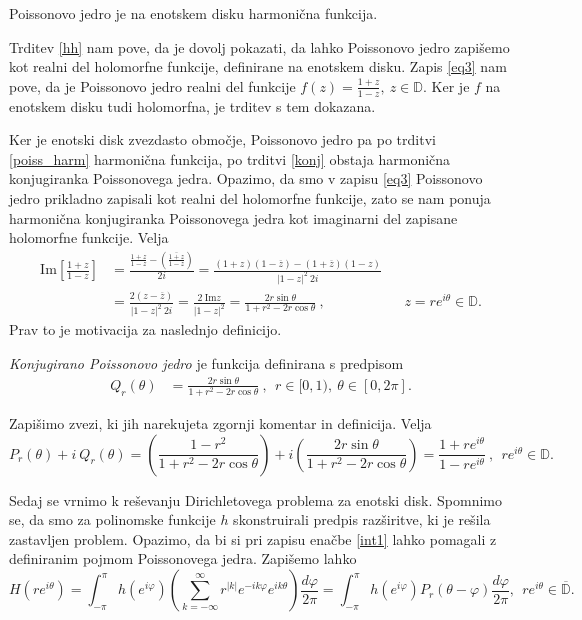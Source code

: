 \documentclass[mat1, tisk]{fmfdelo}
\begin{document}
    \begin{trditev}
        \label{poiss_harm}
        Poissonovo jedro je na enotskem disku harmonična funkcija. 
    \end{trditev}
    \begin{dokaz}
        Trditev \ref{hh} nam pove, da je dovolj pokazati, da lahko Poissonovo jedro zapišemo kot realni del holomorfne funkcije, definirane na enotskem disku.
        Zapis \eqref{eq3} nam pove, da je Poissonovo jedro realni del funkcije $f(z) = \frac{1 + z}{1 - z},~z \in \mathbb{D}$. Ker je $f$ na enotskem disku tudi holomorfna, je trditev s tem dokazana. 
    \end{dokaz}

    Ker je enotski disk zvezdasto območje, Poissonovo jedro pa po trditvi \ref{poiss_harm} harmonična funkcija, po trditvi \ref{konj} obstaja harmonična konjugiranka Poissonovega jedra. 
    Opazimo, da smo v zapisu \eqref{eq3} Poissonovo jedro prikladno zapisali kot realni del holomorfne funkcije, zato se nam ponuja harmonična konjugiranka Poissonovega jedra kot imaginarni del zapisane holomorfne funkcije.
    Velja
    \begin{align*}
        \text{Im}\left[\frac{1 + z}{1-z}\right] &= \frac{\frac{1 + z}{1-z} - \left(\overline{\frac{1 + z}{1-z}}\right)}{2i} = \frac{(1 + z)(1 - \overline{z}) - (1 + \overline{z})(1 - z)}{|1 - z|^2~2i} & & \\ 
        & = \frac{2 (z - \overline{z})}{|1 - z|^2~2i} = \frac{2~\text{Im}z}{|1 - z|^2} = \frac{2 r \sin\theta}{1+ r^2 - 2r \cos\theta}~, & & z = r e^{i\theta} \in \mathbb{D}.
    \end{align*}
    Prav to je motivacija za naslednjo definicijo. 
    \begin{definicija}
        \emph{Konjugirano Poissonovo jedro} je funkcija definirana s predpisom
        \begin{align}
            Q_r(\theta) & = \frac{2 r \sin\theta}{1+ r^2 - 2r \cos\theta}~,~~r \in [0,1),~\theta \in [0,2\pi].
        \end{align}
    \end{definicija}

    Zapišimo zvezi, ki jih narekujeta zgornji komentar in definicija. Velja
    $$
    P_r(\theta) + i~Q_r(\theta) = \left( \frac{1-r^2}{1+ r^2 - 2r \cos\theta}\right) + i \left(\frac{2 r \sin\theta}{1+ r^2 - 2r \cos\theta}\right) = \frac{1 + re^{i\theta}}{1 - re^{i\theta}}~,~~r e^{i\theta} \in \mathbb{D}.
    $$      

    Sedaj se vrnimo k reševanju Dirichletovega problema za enotski disk. 
    Spomnimo se, da smo za polinomske funkcije $h$ skonstruirali predpis razširitve, ki je rešila zastavljen problem. 
    Opazimo, da bi si pri zapisu enačbe \eqref{int1} lahko pomagali z definiranim pojmom Poissonovega jedra. Zapišemo lahko
    $$
    H(r e^{i \theta}) = \int_{-\pi}^{\pi}{h(e^{i \varphi}) \left(\sum_{k = - \infty}^{\infty} r^{|k|} e^{- i k \varphi} e^{i k \theta} \right)}\frac{d \varphi}{2 \pi} = 
    \int_{-\pi}^{\pi}{h(e^{i \varphi}) P_r(\theta - \varphi)\frac{d \varphi}{2 \pi}},~~r e^{i \theta} \in \overline{\mathbb{D}}.
    $$
\end{document}

